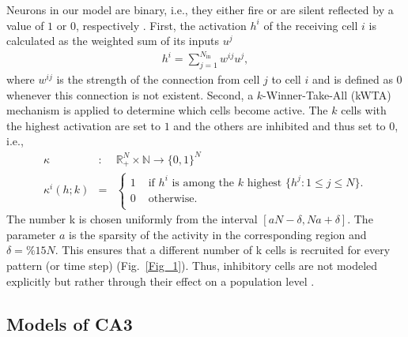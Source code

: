 \documentclass[utf8]{frontiersSCNS} %
\begin{document}
Neurons in our model are binary, i.e., they either fire or are silent reflected by a value of $1$ or $0$, respectively \cite{fontanari1995model}.
%
First, the activation $h^i$ of the receiving cell $i$ is calculated as the weighted sum of its inputs $u^j$
\begin{align}
	\label{activation}
	h^i = \sum_{j=1}^{N_\mathrm{in}} w^{ij}u^j,
\end{align}  
where $w^{ij}$ is the strength of the connection from cell $j$ to cell $i$ and is defined as $0$ whenever this connection is not existent. Second, a $k$-Winner-Take-All (kWTA) mechanism is applied to determine which cells become active. The $k$ cells with the highest activation are set to $1$ and the others are inhibited and thus set to $0$, i.e.,
\begin{eqnarray}
\label{eq:kWTA}
	\kappa &:& \mathbb{R}_+^N \times \mathbb{N} \to \{0,1\}^N \\
	\kappa^i (h;k) &=& \left \{ \begin{array}{ll}
			1 &\text{ if $h^i$ is among the $k$ highest } \{ h^j:1\le j\le N \}. \\
			0 &\text{ otherwise}.\\
	\end{array} \right.
	\label{eq:binary}
\end{eqnarray}
The number k is chosen uniformly from the interval $ [aN - \delta , Na + \delta ]$. The parameter $a$ is the sparsity of the activity in the corresponding region and $\delta = \% 15 N$. This ensures that a different number of k cells is recruited for every pattern (or time step) (Fig.~\ref{Fig_1}).
%
Thus, inhibitory cells are not modeled explicitly but rather through their effect on a population level \cite{renno2010mechanism, roudi2008representing, moustafa2009neurocomputational, appleby2011role, monaco2011modular}.


\subsection{Models of CA3}
\label{ca3:models}
\end{document}
